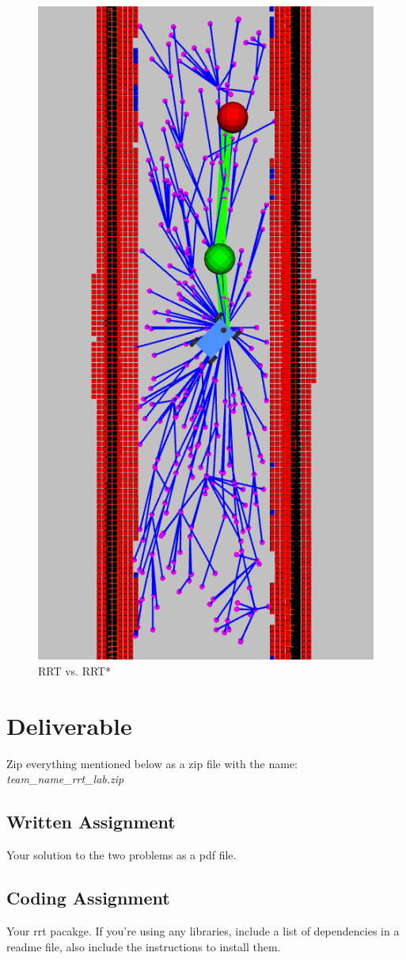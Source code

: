 \documentclass[letter]{article}
\begin{document}
\begin{figure}[!hb]
\begin{center}
    \includegraphics[scale=0.35]{rrt_star.png}
    \end{center}
    \caption{RRT vs. RRT*}
    \label{fig:rrt_rrt_star}
\end{figure}

\section{Deliverable}
Zip everything mentioned below as a zip file with the name: \textit{team\_name\_rrt\_lab.zip}
\subsection{Written Assignment}
Your solution to the two problems as a pdf file.
\subsection{Coding Assignment}
Your rrt pacakge. If you're using any libraries, include a list of dependencies in a readme file, also include the instructions to install them.
\end{document}
